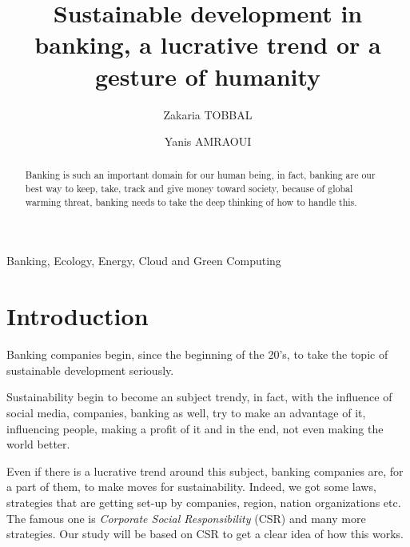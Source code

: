\documentclass{ifacconf}
\begin{document}
\begin{frontmatter}

\title{Sustainable development in banking, a lucrative trend or a gesture of humanity} 

\author[First]{Zakaria TOBBAL}
\author[2]{Yanis AMRAOUI}

\address[First]{Analyst Developer at Crédit Mutuel, and student for EFREI Paris, 30 Av. de la République, 94800 Villejuif (e-mail: zakaria.tobbal@efrei.net).}

\address[2]{Project Manager at Gireve, and student for EFREI Paris, 30 Av. de la République, 94800 Villejuif (e-mail: yanis.amraoui@efrei.net).}

\begin{abstract}                %
Banking is such an important domain for our human being, in fact, banking are our best way to keep, take, track and give money toward society, because of global warming threat, banking needs to take the deep thinking of how to handle this.
\end{abstract}

\begin{keyword}
    Banking, Ecology, Energy, Cloud and Green Computing
\end{keyword}

\end{frontmatter}

\section{Introduction}
Banking companies begin, since the beginning of the 20's, to take the topic of sustainable development seriously.

Sustainability begin to become an subject trendy, in fact, with the influence of social media, companies, banking as well, try to make an advantage of it, influencing people, making a profit of it and in the end, not even making the world better.

Even if there is a lucrative trend around this subject, banking companies are, for a part of them, to make moves for sustainability. Indeed, we got some laws, strategies that are getting set-up by companies, region, nation organizations etc. The famous one is \textit{Corporate Social Responsibility} (CSR) and many more strategies. Our study will be based on CSR to get a clear idea of how this works.
\end{document}
